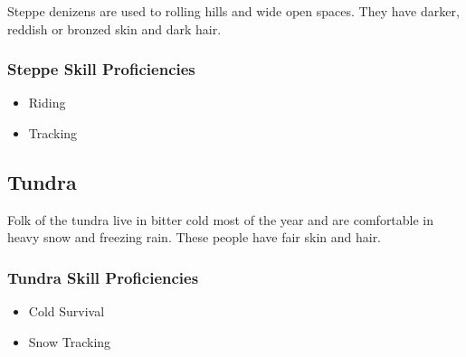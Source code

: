 \begin{multicols}{2}
Steppe denizens are used to rolling hills and wide open spaces. They have
darker, reddish or bronzed skin and dark hair.

\subsubsection{Steppe Skill Proficiencies}

\begin{itemize}
  \item Riding
  \item Tracking
\end{itemize}

\subsection{Tundra}

Folk of the tundra live in bitter cold most of the year and are comfortable
in heavy snow and freezing rain. These people have fair skin and hair.

\subsubsection{Tundra Skill Proficiencies}

\begin{itemize}
  \item Cold Survival
  \item Snow Tracking
\end{itemize}

\end{multicols}
